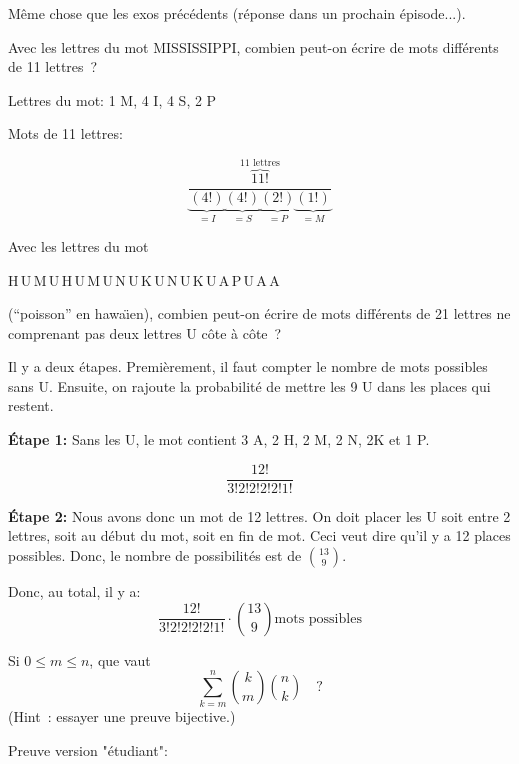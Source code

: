 Même chose que les exos précédents (réponse dans un prochain épisode...).


\begin{exo} 
Avec les lettres du mot MISSISSIPPI, combien peut-on \'ecrire de mots diff\'erents de 11 lettres~?
\end{exo}

Lettres du mot: 1 M, 4 I, 4 S, 2 P 

Mots de 11 lettres:

\[ \frac{\overbrace{11!}^{\text{11 lettres}}}{\underbrace{(4!)}_{=I}\underbrace{(4!)}_{=S}\underbrace{(2!)}_{=P}\underbrace{(1!)}_{=M}} \]

\newpage

\begin{exo} 
Avec les lettres du mot 
%
\begin{center}
H\,U\,M\,U\,H\,U\,M\,U\,N\,U\,K\,U\,N\,U\,K\,U\,A\,P\,U\,A\,A
\end{center}
(``poisson'' en hawa\"\i{}en), combien peut-on \'ecrire de mots diff\'erents de 21 lettres ne comprenant pas deux lettres U c\^ote \`a c\^ote~?
\end{exo}

Il y a deux étapes. Premièrement, il faut compter le nombre de mots possibles sans U. Ensuite, on rajoute la probabilité de mettre les 9 U dans les places qui restent.

\textbf{Étape 1: } Sans les U, le mot contient 3 A, 2 H, 2 M, 2 N, 2K et 1 P.

\[ \frac{12!}{3! 2! 2! 2! 2! 1!} \]

\textbf{Étape 2: } Nous avons donc un mot de 12 lettres. On doit placer les U soit entre 2 lettres, soit au début du mot, soit en fin de mot. Ceci veut dire qu'il y a 12 places possibles. Donc, le nombre de possibilités est de $ {13 \choose 9} $.

Donc, au total, il y a: \[ \frac{12!}{3! 2! 2! 2! 2! 1!} \cdot {13 \choose 9} \text{mots possibles} \]



\begin{exo} 
Si $0 \leqslant m \leqslant n$, que vaut
\[
\sum_{k=m}^n {k \choose m}{n \choose k}\quad ?
\]
(Hint~: essayer une preuve bijective.)
\end{exo}

Preuve version "étudiant": 

